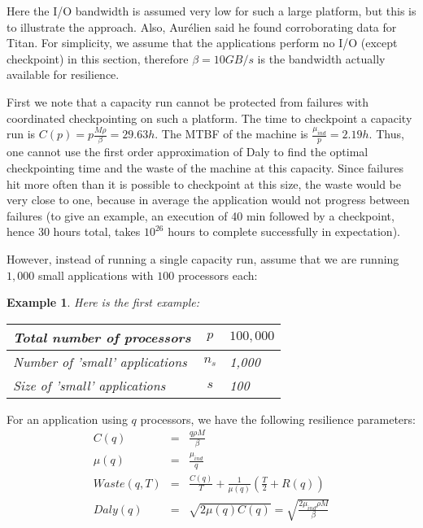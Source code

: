 \documentclass{article}
\newtheorem{example}{Example}
\newcommand{\ema}[1]{\ensuremath{#1}}
\newcommand{\Waste}{\ema{\mathit{Waste}}\xspace}
\newcommand{\Daly}{\ema{\mathit{Daly}}\xspace}
\begin{document}
Here the I/O bandwidth is assumed very low for such a large platform, but this is 
to illustrate the approach. Also, Aurélien said he found corroborating data for Titan.
For simplicity, we assume that the applications perform no I/O (except checkpoint) in this section, therefore $\beta=10GB/s$ is the bandwidth actually available for resilience.

First we note that a capacity run cannot be protected from failures with
coordinated checkpointing on such a platform.
The time to checkpoint a capacity run is $C(p) = p\frac{M \rho}{\beta} = 29.63h$. The MTBF of the machine is $\frac{\mu_{ind}}{p} = 2.19h$. Thus, one cannot use the first order approximation of Daly to find the optimal checkpointing time and the waste of the machine at this capacity. Since failures hit more often than it is possible to checkpoint at this size, the waste would be very close to one, because in average the application would not progress between failures (to give an example, an execution of 40 min
followed by a checkpoint, hence 30 hours total, takes $10^{26}$ hours to complete successfully in expectation).

However, instead of running a single capacity run, assume that we are running
$1,000$ small applications with $100$ processors each:

\begin{example}
Here is the first example:
\begin{center}
\begin{tabular}{lcl}
  Total number of processors & $p$ & $100,000$\\\hline
  Number of 'small' applications & $n_{s}$ & 1,000\\\hline
  Size of 'small' applications & $s$ & 100\\\hline
\end{tabular}
\end{center}
\label{example1}
\end{example}

For an application using $q$ processors, we have the following resilience parameters:
\begin{eqnarray}
C(q) &=& \frac{q\rho M}{\beta}\\
\mu(q) &=& \frac{\mu_{ind}}{q}\\
\Waste(q, T) &=& \frac{C(q)}{T} + \frac{1}{\mu(q)}\left(\frac{T}{2}+R(q)\right)\\
\Daly(q) &=& \sqrt{2\mu(q)C(q)} = \sqrt{\frac{2\mu_{ind}\rho M}{\beta}}
\end{eqnarray}
\end{document}
